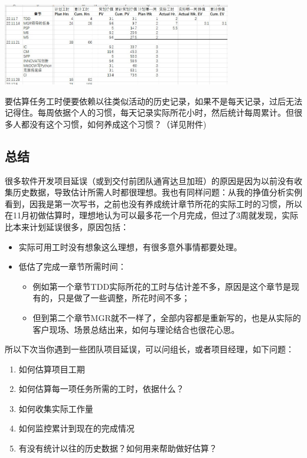 

\includegraphics[width=10cm]{PSPend2ndWkEvScreenshot20221126091326.jpg}

要估算任务工时便要依赖以往类似活动的历史记录，如果不是每天记录，过后无法记得住。每周依据个人的习惯，每天记录实际所花小时，然后统计每周累计。但很多人都没有这个习惯，如何养成这个习惯？（详见附件)


\hypertarget{ux603bux7ed3}{%
\subsection{总结}\label{ux603bux7ed3}}

很多软件开发项目延误（或到交付前团队通宵达旦加班）的原因是因为以前没有收集历史数据，导致估计所需人时都很理想。我也有同样问题：从我的挣值分析实例看到，因我是第一次写书，之前也没有养成统计章节所花的实际工时的习惯，所以在11月初做估算时，理想地认为可以最多花一个月完成，但过了3周就发现，实际比本来计划延误很多，原因包括：

\begin{itemize}
\tightlist
\item
  实际可用工时没有想象这么理想，有很多意外事情都要处理。
\item
  低估了完成一章节所需时间：

  \begin{itemize}
  \tightlist
  \item
    例如第一个章节TDD实际所花的工时与估计差不多，原因是这个章节是现有的，只是做了一些调整，所花时间不多；
  \item
    但到第二个章节MGR就不一样了，全部内容都是重新写的，也是从实际的客户现场、场景总结出来，如何与理论结合也很花心思。
  \end{itemize}
\end{itemize}

所以下次当你遇到一些团队项目延误，可以问组长，或者项目经理，如下问题：

\begin{enumerate}
\tightlist
\item
  如何估算项目工期\\
\item
  如何估算每一项任务所需的工时，依据什么？\\
\item
  如何收集实际工作量\\
\item
  如何监控累计到现在的完成情况\\
\item
  有没有统计以往的历史数据？如何用来帮助做好估算？\\
\end{enumerate}

